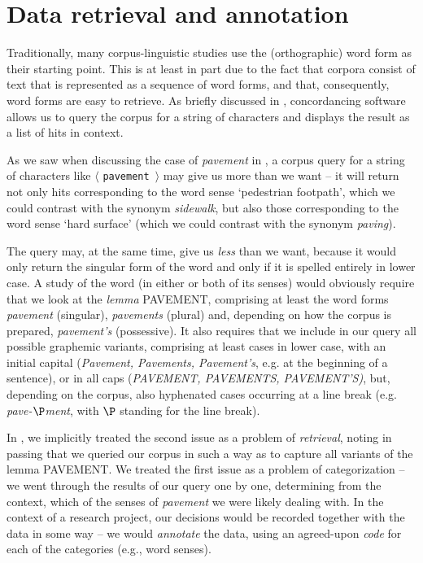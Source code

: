 \chapter{Data retrieval and annotation}
\label{ch:retrievalannotation}


Traditionally, many corpus\hyp{}linguistic studies use the (orthographic) word form as their starting point. This is at least in part due to the fact that corpora consist of text that is represented as a sequence of word forms, and that, consequently, word forms are easy to retrieve.  As briefly discussed in , concordancing  software allows us to query  the corpus for a string of characters and displays the result as a list of hits  in context.

As we saw when discussing the case of \textit{pavement} in , a corpus query  for a string of characters like $\langle$ \texttt{pavement} $\rangle$ may give us more than we want -- it will return not only hits  corresponding to the word sense `pedestrian footpath', which we could contrast with the synonym  \textit{sidewalk}, but also those corresponding to the word sense `hard surface' (which we could contrast with the synonym \textit{paving}).

The query  may, at the same time, give us \emph{less} than we want, because it would only return the singular  form of the word and only if it is spelled entirely in lower case. A study of the word (in either or both of its senses) would obviously require that we look at the \emph{lemma}  PAVEMENT, comprising at least the word forms \textit{pavement} (singular), \textit{pavements} (plural) and, depending on how the corpus is prepared, \textit{pavement's} (possessive). It also requires that we include in our query  all possible graphemic variants, comprising at least cases in lower case, with an initial capital (\textit{Pavement, Pavements, Pavement's}, e.g. at the beginning of a sentence), or in all caps (\textit{PAVEMENT, PAVEMENTS, PAVEMENT'S)}, but, depending on the corpus, also hyphenated cases occurring at a line break (e.g. \textit{pave-}$\P$\textit{ment}, with $\P$ standing for the line break).

In , we implicitly treated the second issue as a problem of \textit{retrieval},  noting in passing that we queried  our corpus in such a way as to capture all variants of the lemma  PAVEMENT. We treated the first issue as a problem of categorization  -- we went through the results of our query one by one, determining from the context, which of the senses of \textit{pavement} we were likely dealing with. In the context of a research project, our decisions would be recorded together with the data in some way -- we would \emph{annotate}  the data, using an agreed\hyp{}upon \emph{code}  for each of the categories  (e.g., word senses).

